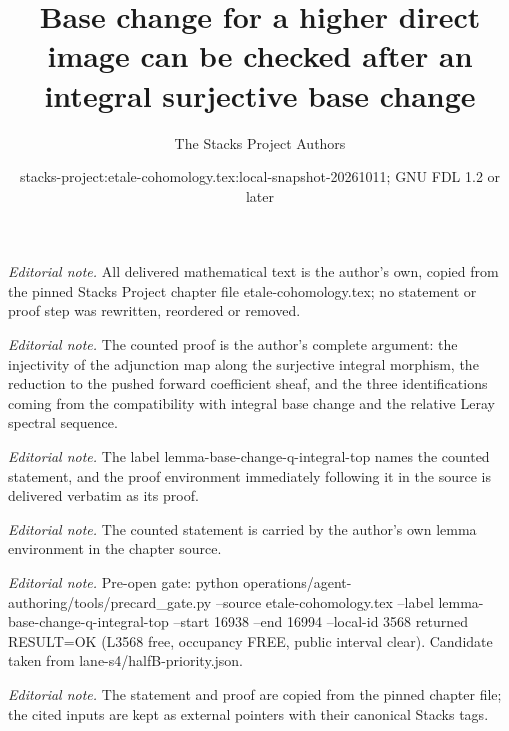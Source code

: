 \documentclass[10pt,a4paper]{amsart}
\title{Base change for a higher direct image can be checked after an integral surjective base change}
\author{The Stacks Project Authors}
\date{stacks-project:etale-cohomology.tex:local-snapshot-20261011; GNU FDL 1.2 or later}
\theoremstyle{plain}
\theoremstyle{definition}
\theoremstyle{remark}
\numberwithin{equation}{subsection}
\begin{document}
\maketitle
\noindent\textit{Editorial note.} All delivered mathematical text is the author's own, copied from the pinned Stacks Project chapter file etale-cohomology.tex; no statement or proof step was rewritten, reordered or removed.\par\medskip
\noindent\textit{Editorial note.} The counted proof is the author's complete argument: the injectivity of the adjunction map along the surjective integral morphism, the reduction to the pushed forward coefficient sheaf, and the three identifications coming from the compatibility with integral base change and the relative Leray spectral sequence.\par\medskip
\noindent\textit{Editorial note.} The label lemma-base-change-q-integral-top names the counted statement, and the proof environment immediately following it in the source is delivered verbatim as its proof.\par\medskip
\noindent\textit{Editorial note.} The counted statement is carried by the author's own lemma environment in the chapter source.\par\medskip
\noindent\textit{Editorial note.} Pre-open gate: python operations/agent-authoring/tools/precard\_gate.py --source etale-cohomology.tex --label lemma-base-change-q-integral-top --start 16938 --end 16994 --local-id 3568 returned RESULT=OK (L3568 free, occupancy FREE, public interval clear). Candidate taken from lane-s4/halfB-priority.json.\par\medskip
\noindent\textit{Editorial note.} The statement and proof are copied from the pinned chapter file; the cited inputs are kept as external pointers with their canonical Stacks tags.\par\medskip
\end{document}
